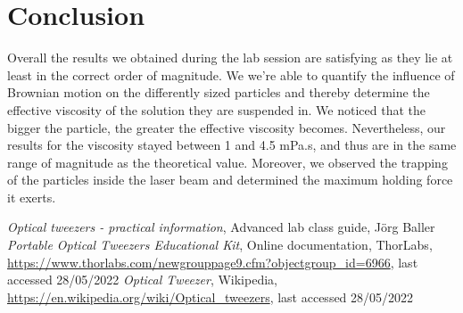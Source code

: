 \documentclass{article}
\begin{document}
\section{Conclusion}
Overall the results we obtained during the lab session are satisfying as they lie at least in the correct order of magnitude. We we're able to quantify the influence of Brownian motion on the differently sized particles and thereby determine the effective viscosity of the solution they are suspended in. We noticed that the bigger the particle, the greater the effective viscosity becomes. Nevertheless, our results for the viscosity stayed between 1 and 4.5 mPa.s, and thus are in the same range of magnitude as the theoretical value. Moreover, we observed the trapping of the particles inside the laser beam and determined the maximum holding force it exerts.
\begin{thebibliography}{}
     \textit{Optical tweezers - practical information}, Advanced lab class guide, Jörg Baller
     \textit{Portable Optical Tweezers Educational Kit}, Online documentation, ThorLabs, \url{https://www.thorlabs.com/newgrouppage9.cfm?objectgroup_id=6966}, last accessed 28/05/2022 
     \textit{Optical Tweezer}, Wikipedia, \url{https://en.wikipedia.org/wiki/Optical_tweezers}, last accessed 28/05/2022
\end{thebibliography}
\end{document}
